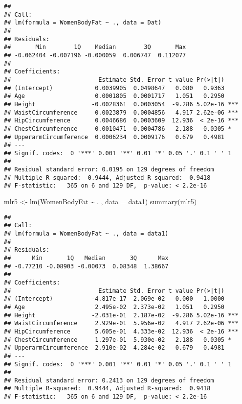 \documentclass[
]{article}
\newenvironment{Shaded}{\begin{snugshade}}{\end{snugshade}}
\newcommand{\AttributeTok}[1]{\textcolor[rgb]{0.77,0.63,0.00}{#1}}
\newcommand{\FunctionTok}[1]{\textcolor[rgb]{0.00,0.00,0.00}{#1}}
\newcommand{\NormalTok}[1]{#1}
\newcommand{\OtherTok}[1]{\textcolor[rgb]{0.56,0.35,0.01}{#1}}
\newcommand{\SpecialCharTok}[1]{\textcolor[rgb]{0.00,0.00,0.00}{#1}}
\begin{document}
\begin{verbatim}
## 
## Call:
## lm(formula = WomenBodyFat ~ ., data = Dat)
## 
## Residuals:
##       Min        1Q    Median        3Q       Max 
## -0.062404 -0.007196 -0.000059  0.006747  0.112077 
## 
## Coefficients:
##                         Estimate Std. Error t value Pr(>|t|)    
## (Intercept)            0.0039905  0.0498647   0.080   0.9363    
## Age                    0.0001805  0.0001717   1.051   0.2950    
## Height                -0.0028361  0.0003054  -9.286 5.02e-16 ***
## WaistCircumference     0.0023879  0.0004856   4.917 2.62e-06 ***
## HipCircumference       0.0046686  0.0003609  12.936  < 2e-16 ***
## ChestCircumference     0.0010471  0.0004786   2.188   0.0305 *  
## UpperarmCircumference  0.0006234  0.0009176   0.679   0.4981    
## ---
## Signif. codes:  0 '***' 0.001 '**' 0.01 '*' 0.05 '.' 0.1 ' ' 1
## 
## Residual standard error: 0.0195 on 129 degrees of freedom
## Multiple R-squared:  0.9444, Adjusted R-squared:  0.9418 
## F-statistic:   365 on 6 and 129 DF,  p-value: < 2.2e-16
\end{verbatim}

\begin{Shaded}
\begin{Highlighting}[]
\NormalTok{mlr5 }\OtherTok{\textless{}{-}} \FunctionTok{lm}\NormalTok{(WomenBodyFat }\SpecialCharTok{\textasciitilde{}}\NormalTok{ . , }\AttributeTok{data =}\NormalTok{ data1)}
\FunctionTok{summary}\NormalTok{(mlr5)}
\end{Highlighting}
\end{Shaded}

\begin{verbatim}
## 
## Call:
## lm(formula = WomenBodyFat ~ ., data = data1)
## 
## Residuals:
##      Min       1Q   Median       3Q      Max 
## -0.77210 -0.08903 -0.00073  0.08348  1.38667 
## 
## Coefficients:
##                         Estimate Std. Error t value Pr(>|t|)    
## (Intercept)           -4.817e-17  2.069e-02   0.000   1.0000    
## Age                    2.495e-02  2.373e-02   1.051   0.2950    
## Height                -2.031e-01  2.187e-02  -9.286 5.02e-16 ***
## WaistCircumference     2.929e-01  5.956e-02   4.917 2.62e-06 ***
## HipCircumference       5.605e-01  4.333e-02  12.936  < 2e-16 ***
## ChestCircumference     1.297e-01  5.930e-02   2.188   0.0305 *  
## UpperarmCircumference  2.910e-02  4.284e-02   0.679   0.4981    
## ---
## Signif. codes:  0 '***' 0.001 '**' 0.01 '*' 0.05 '.' 0.1 ' ' 1
## 
## Residual standard error: 0.2413 on 129 degrees of freedom
## Multiple R-squared:  0.9444, Adjusted R-squared:  0.9418 
## F-statistic:   365 on 6 and 129 DF,  p-value: < 2.2e-16
\end{verbatim}
\end{document}
